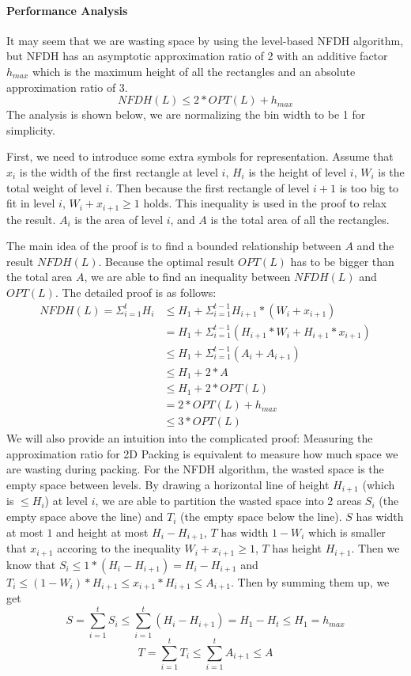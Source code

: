 \documentclass[sigplan,screen,nonacm]{acmart}\settopmatter{printfolios=true,printccs=false,printacmref=false}
\begin{document}
\paragraph{Performance Analysis}
It may seem that we are wasting space by using the level-based NFDH algorithm, but NFDH has an asymptotic approximation ratio of 2 with an additive factor $h_{max}$ which is the maximum height of all the rectangles and an absolute approximation ratio of 3.
$$NFDH(L) \leq 2*OPT(L) + h_{max}$$
The analysis is shown below, we are normalizing the bin width to be 1 for simplicity.\par
First, we need to introduce some extra symbols for representation. Assume that $x_i$ is the width of the first rectangle at level $i$, $H_i$ is the height of level $i$, $W_i$ is the total weight of level $i$. Then because the first rectangle of level $i+1$ is too big to fit in level $i$, $W_{i} + x_{i+1} \geq 1$ holds. This inequality is used in the proof to relax the result. $A_i$ is the area of level $i$, and $A$ is the total area of all the rectangles. \par
The main idea of the proof is to find a bounded relationship between $A$ and the result $NFDH(L)$. Because the optimal result $OPT(L)$ has to be bigger than the total area $A$, we are able to find an inequality between $NFDH(L)$ and $OPT(L)$. The detailed proof is as follows:
\begin{align*}
  NFDH(L) = \Sigma_{i=1}^{t}H_i  &\leq H_1 + \Sigma_{i=1}^{t-1}H_{i+1}*(W_i + x_{i+1})\\
                & = H_1 + \Sigma_{i=1}^{t-1}(H_{i+1}*W_i + H_{i+1}*x_{i+1})\\
                & \leq H_1 + \Sigma_{i=1}^{t-1}(A_i + A_{i+1})\\
                & \leq H_1 + 2*A\\
                & \leq H_1 + 2*OPT(L)\\
                & = 2*OPT(L) + h_{max} \\
                & \leq 3*OPT(L)
\end{align*}
We will also provide an intuition into the complicated proof: Measuring the approximation ratio for 2D Packing is equivalent to measure how much space we are wasting during packing. For the NFDH algorithm, the wasted space is the empty space between levels. By drawing a horizontal line of height $H_{i+1}$ (which is $\leq H_i$) at level $i$, we are able to partition the wasted space into 2 areas $S_i$ (the empty space above the line) and $T_i$ (the empty space below the line). $S$ has width at most $1$ and height at most $H_i - H_{i+1}$, $T$ has width $1-W_i$ which is smaller that $x_{i+1}$ accoring to the inequality $W_{i} + x_{i+1} \geq 1$, $T$ has height $H_{i+1}$. Then we know that $S_i \leq 1*(H_i - H_{i+1}) = H_i - H_{i+1}$ and $T_i \leq (1 - W_i)*H_{i+1} \leq x_{i+1}*H_{i+1} \leq A_{i+1}$. Then by summing them up, we get $$S = \sum_{i=1}^{t} S_{i} \leq \sum_{i=1}^{t} (H_i - H_{i+1}) = H_1 - H_t \leq H_1 = h_{max}$$ $$T = \sum_{i=1}^{t}T_i \leq \sum_{i=1}^{t}A_{i+1} \leq A$$
\end{document}
